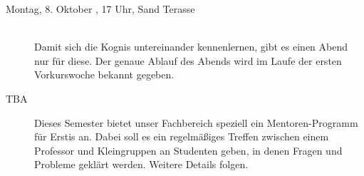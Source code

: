\begin{description}
\fi

\ifkogwiss
    \item[Montag, 8. Oktober \YEAR, 17 Uhr, Sand Terasse ]\ \\
    Damit sich die Kognis untereinander kennenlernen, gibt es einen Abend nur für diese. Der genaue Ablauf des Abends wird im Laufe der ersten Vorkurswoche bekannt gegeben.
\fi

\ifbachelor
	\item[TBA] Dieses Semester bietet unser Fachbereich speziell ein Mentoren-Programm für Erstis an. Dabei soll es ein regelmäßiges Treffen zwischen einem Professor und Kleingruppen an Studenten geben, in denen Fragen und Probleme geklärt werden. Weitere Details folgen.
\fi

\end{description}
